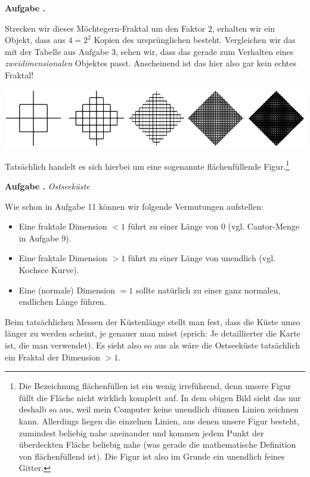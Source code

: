\documentclass[a4paper,ngerman,12pt]{scrartcl}
\theoremstyle{definition}
\theoremstyle{plain}
\theoremstyle{remark}
\newlength{\aufgabenskip}
\newcounter{aufgabennummer}
\newenvironment{aufgabe}[1]{
  \addtocounter{aufgabennummer}{1}
  \textbf{Aufgabe \theaufgabennummer.} \emph{#1} \par
}{\vspace{\aufgabenskip}}
\begin{document}
\begin{aufgabe}{}
	Strecken wir dieses Möchtegern-Fraktal um den Faktor $2$, erhalten wir ein Objekt, dass aus $4 = 2^2$ Kopien des ursprünglichen besteht. Vergleichen wir das mit der Tabelle aus Aufgabe 3, sehen wir, dass das gerade zum Verhalten eines \emph{zweidimensionalen} Objektes passt. Anscheinend ist das hier also gar kein \glqq echtes Fraktal\grqq!
	
	\begin{center}
		\includegraphics[width=.6\textwidth]{Bilder/Nicht-Fraktal-mehr-Schritte.pdf}
	\end{center}	
	
	Tatsächlich handelt es sich hierbei um eine sogenannte \glqq flächenfüllende\grqq{} Figur.\footnote{Die Bezeichnung \glqq flächenfüllen\grqq{} ist ein wenig irreführend, denn unsere Figur füllt die Fläche nicht wirklich komplett auf. In dem obigen Bild sieht das nur deshalb so aus, weil mein Computer keine unendlich dünnen Linien zeichnen kann. Allerdings liegen die einzelnen Linien, aus denen unsere Figur besteht, zumindest \glqq beliebig nahe aneinander\grqq{} und kommen jedem Punkt der überdeckten Fläche \glqq beliebig nahe (was gerade die mathematische Definition von \glqq flächenfüllend\grqq{} ist). Die Figur ist also im Grunde ein unendlich feines Gitter.} 
\end{aufgabe}

\begin{aufgabe}{Ostseeküste}
	Wie schon in Aufgabe 11 können wir folgende Vermutungen aufstellen:
	\begin{itemize}
		\item Eine fraktale Dimension $< 1$ führt zu einer Länge von $0$ (vgl. Cantor-Menge in Aufgabe 9).
		\item Eine fraktale Dimension $> 1$ führt zu einer Länge von unendlich (vgl. Kochsce Kurve).
		\item Eine (normale) Dimension $= 1$ sollte natürlich zu einer ganz normalen, endlichen Länge führen.
	\end{itemize}
	
	Beim tatsächlichen Messen der Küstenlänge stellt man fest, dass die Küste umso länger zu werden scheint, je genauer man misst (sprich: Je detaillierter die Karte ist, die man verwendet). Es sieht also so aus als wäre die Ostseeküste tatsächlich ein Fraktal der Dimension $> 1$.
\end{aufgabe}
\end{document}
